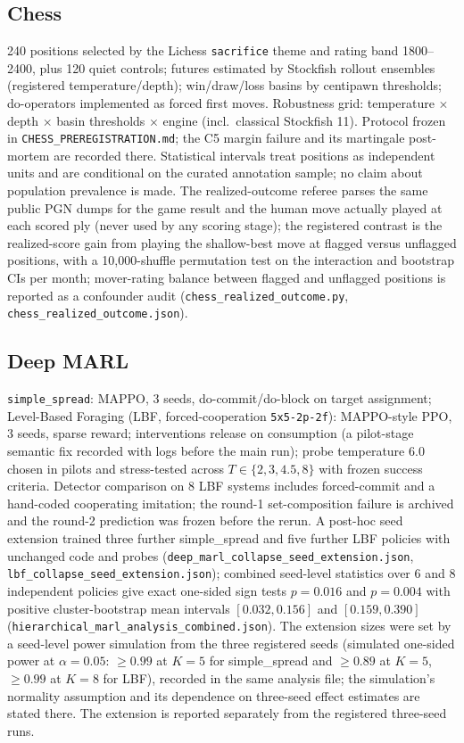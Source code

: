 \documentclass[11pt]{article}
\theoremstyle{definition}
\begin{document}
\subsection*{Chess}
240 positions selected by the Lichess \texttt{sacrifice} theme and
rating band 1800--2400, plus 120 quiet controls; futures estimated by Stockfish rollout ensembles
(registered temperature/depth); win/draw/loss basins by centipawn
thresholds; do-operators implemented as forced first moves. Robustness
grid: temperature $\times$ depth $\times$ basin thresholds $\times$
engine (incl.\ classical Stockfish 11). Protocol frozen in
\texttt{CHESS\_PREREGISTRATION.md}; the C5 margin failure and its
martingale post-mortem are recorded there. Statistical intervals treat
positions as independent units and are conditional on the curated
annotation sample; no claim about population prevalence is made.
The realized-outcome referee parses the same public PGN dumps for the
game result and the human move actually played at each scored ply
(never used by any scoring stage); the registered contrast is the
realized-score gain from playing the shallow-best move at flagged
versus unflagged positions, with a 10,000-shuffle permutation test on
the interaction and bootstrap CIs per month; mover-rating balance
between flagged and unflagged positions is reported as a confounder
audit (\texttt{chess\_realized\_outcome.py},
\texttt{chess\_realized\_outcome.json}).

\subsection*{Deep MARL}
\texttt{simple\_spread}: MAPPO, 3 seeds, do-commit/do-block on target
assignment; Level-Based Foraging (LBF, forced-cooperation
\texttt{5x5-2p-2f}): MAPPO-style PPO, 3 seeds, sparse reward;
interventions release on consumption (a
pilot-stage semantic fix recorded with logs before the main run);
probe temperature 6.0 chosen in pilots and stress-tested across
$T \in \{2,3,4.5,8\}$ with frozen success criteria. Detector
comparison on 8 LBF systems includes forced-commit and a hand-coded
cooperating imitation; the round-1 set-composition failure is archived
and the round-2 prediction was frozen before the rerun.
A post-hoc seed extension trained three further simple\_spread and
five further LBF policies with unchanged code and probes
(\texttt{deep\_marl\_collapse\_seed\_extension.json},
\texttt{lbf\_collapse\_seed\_extension.json}); combined seed-level
statistics over $6$ and $8$ independent policies give exact one-sided
sign tests $p=0.016$ and $p=0.004$ with positive cluster-bootstrap mean
intervals $[0.032,0.156]$ and $[0.159,0.390]$
(\texttt{hierarchical\_marl\_analysis\_combined.json}). The extension
sizes were set by a seed-level power simulation from the three
registered seeds (simulated one-sided power at $\alpha=0.05$:
$\ge 0.99$ at $K=5$ for simple\_spread and $\ge 0.89$ at $K=5$,
$\ge 0.99$ at $K=8$ for LBF), recorded in the same analysis file; the
simulation's normality assumption and its dependence on three-seed
effect estimates are stated there. The extension is reported
separately from the registered three-seed runs.
\end{document}
